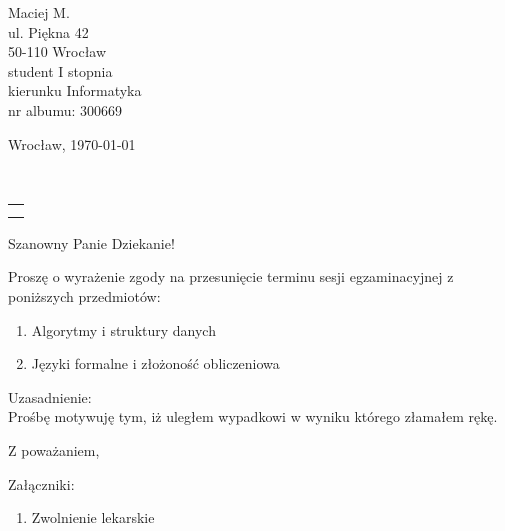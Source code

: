 \documentclass[12 pt, a4paper, fromalign=left]{letter}
\date{} %
\makeatletter
\renewcommand*{\opening}[1]{\ifx\@empty\fromaddress%
  \thispagestyle{firstpage}%
    {\raggedleft\@date\par}%
  \else%
   \thispagestyle{empty}%
   {%
    \begin{minipage}[c]{0.50\linewidth}
    \toname \\
    \toaddress
    \end{minipage}
    \begin{minipage}[c]{0.45\linewidth}
    \raggedleft\begin{tabular}{l@{}}\ignorespaces
    \fromaddress\\[0.0em]%
    \@date
    \end{tabular}
    \end{minipage}
    \par
}%
  \fi
  \vspace{2\parskip}%
  #1\par\nobreak}
\makeatother
\begin{document}
\begin{letter}{Maciej M.\\
ul. Piękna 42\\
50-110 Wrocław\\
student I stopnia\\
kierunku Informatyka\\
nr albumu: 300669}
\begin{flushright}
Wrocław,
\today
\end{flushright}
\opening{Szanowny Panie Dziekanie!}	

Proszę o wyrażenie zgody na przesunięcie terminu sesji egzaminacyjnej z poniższych przedmiotów:
\begin{enumerate}
\item Algorytmy i struktury danych
\item Języki formalne i złożoność obliczeniowa
\end{enumerate}

Uzasadnienie:\\
Prośbę motywuję tym, iż uległem wypadkowi w wyniku którego złamałem rękę.

\closing{Z poważaniem,}

Załączniki:
\begin{enumerate}
\item Zwolnienie lekarskie
\end{enumerate}

\end{letter}
\end{document}
